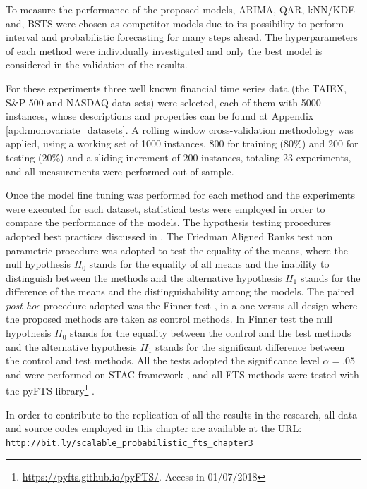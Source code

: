 To measure the performance of the proposed models, ARIMA, QAR, kNN/KDE and, BSTS were chosen as competitor models due to its possibility to perform interval and probabilistic forecasting for many steps ahead. The hyperparameters of each method were individually investigated and only the best model is considered in the validation of the results.

For these experiments three well known financial time series data (the TAIEX, S\&P 500 and NASDAQ data sets) were selected, each of them with 5000 instances, whose descriptions and properties can be found at Appendix \ref{apd:monovariate_datasets}. A rolling window cross-validation methodology \cite{Tashman2000} was applied, using a working set of 1000 instances, 800 for training (80\%) and 200 for testing (20\%) and a sliding increment of 200 instances, totaling 23 experiments, and all measurements were performed out of sample.

Once the model fine tuning was performed for each method and the experiments were executed for each dataset, statistical tests were employed in order to compare the performance of the models. The hypothesis testing procedures adopted best practices discussed in \cite{Garcia2010,Derrac2011,Trawinski2012}. The Friedman Aligned Ranks test \cite{friedmanalignedrankstest} non parametric procedure was adopted to test the equality of the means, where the null hypothesis $H_0$ stands for the equality of all means and the inability to distinguish between the methods and the alternative hypothesis $H_1$ stands for the difference of the means and the distinguishability among the models. The paired \textit{post hoc} procedure adopted was the Finner test \cite{finnertest}, in a one-versus-all design where the proposed methods are taken as control methods. In Finner test  the null hypothesis $H_0$ stands for the equality between the control and the test methods and the alternative hypothesis $H_1$ stands for the significant difference between the control and test methods. All the tests adopted the significance level $\alpha = .05$ and were performed on STAC framework \cite{stac}, and all FTS methods were tested with the pyFTS library\footnote{\url{https://pyfts.github.io/pyFTS/}. Access in 01/07/2018} \cite{pyFTS}. 

In order to contribute to the replication of all the results in the research, all data and source codes employed in this chapter are available at the URL:
\texttt{\url{http://bit.ly/scalable_probabilistic_fts_chapter3}}

